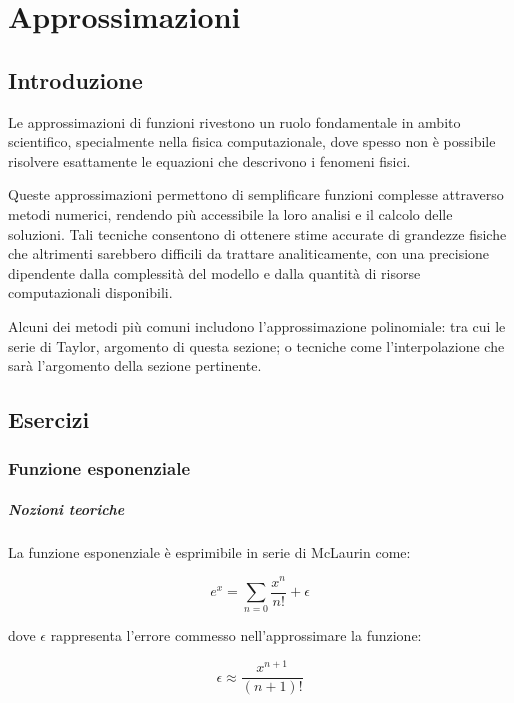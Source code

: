 \setchapterpreamble[u]{\margintoc}
\chapter{Approssimazioni}



\section{Introduzione}

Le approssimazioni di funzioni rivestono un ruolo fondamentale in ambito scientifico,
specialmente nella fisica computazionale, dove spesso non è possibile risolvere
esattamente le equazioni che descrivono i fenomeni fisici.

Queste approssimazioni permettono di semplificare funzioni complesse attraverso
metodi numerici, rendendo più accessibile la loro analisi e il calcolo delle
soluzioni.
Tali tecniche consentono di ottenere stime accurate di grandezze fisiche che
altrimenti sarebbero difficili da trattare analiticamente, con una precisione
dipendente dalla complessità del modello e dalla quantità di risorse computazionali
disponibili.

Alcuni dei metodi più comuni includono l'approssimazione polinomiale: tra cui
le serie di Taylor, argomento di questa sezione; o tecniche come l'interpolazione
che sarà l'argomento della sezione pertinente.

\section{Esercizi}


\subsection{Funzione esponenziale}

\paragraph{Nozioni teoriche}

La funzione esponenziale è esprimibile in serie di McLaurin come:

$$
	e^x = \sum_{n=0} \frac{x^n}{n!} + \epsilon
$$

dove $\epsilon$ rappresenta l'errore commesso nell'approssimare la funzione:

$$
	\epsilon \approx \frac{x^{n+1}}{(n+1)!}
$$

